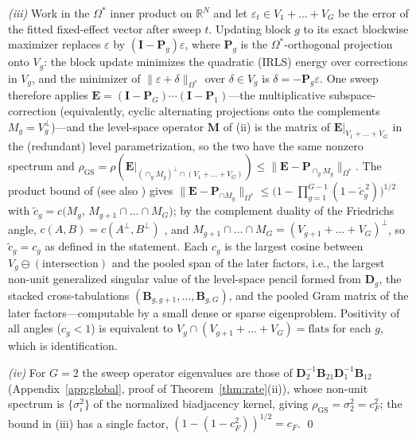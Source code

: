 \documentclass[11pt]{article}
\newcommand{\R}{\mathbb{R}}
\newcommand{\bB}{\mathbf{B}}
\newcommand{\bD}{\mathbf{D}}
\newcommand{\bI}{\mathbf{I}}
\newcommand{\bP}{\mathbf{P}}
\begin{document}
\emph{(iii)}  Work in the $\Omega^\ast$ inner product on $\R^N$ and let
$\varepsilon_t \in V_1 + \dots + V_G$ be the error of the fitted
fixed-effect vector after sweep $t$.  Updating block $g$ to its exact
blockwise maximizer replaces $\varepsilon$ by $(\bI -
\bP_g)\varepsilon$, where $\bP_g$ is the $\Omega^\ast$-orthogonal
projection onto $V_g$: the block update minimizes the quadratic (IRLS)
energy over corrections in $V_g$, and the minimizer of
$\|\varepsilon + \delta\|_{\Omega^\ast}$ over $\delta \in V_g$ is
$\delta = -\bP_g\varepsilon$.  One sweep therefore applies
$\mathbf{E} = (\bI - \bP_G)\cdots(\bI - \bP_1)$---the multiplicative
subspace-correction (equivalently, cyclic alternating projections onto
the complements $M_g = V_g^{\perp}$)---and the level-space operator
$\mathbf{M}$ of (ii) is the matrix of
$\mathbf{E}|_{V_1 + \dots + V_G}$ in the (redundant) level
parametrization, so the two have the same nonzero spectrum and
$\rho_{\mathrm{GS}} = \rho(\mathbf{E}|_{(\cap_g M_g)^{\perp} \cap (V_1 +
\dots + V_G)}) \le \|\mathbf{E} - \bP_{\cap_g M_g}\|_{\Omega^\ast}$.
The product bound of \citet{smith1977} (see also
\citealp{deutschhundal1997,badea2012}) gives
$\|\mathbf{E} - \bP_{\cap M_g}\|_{\Omega^\ast} \le \big(1 -
\prod_{g=1}^{G-1}(1 - \tilde c_g^{\,2})\big)^{1/2}$ with $\tilde c_g =
c\big(M_g,\, M_{g+1} \cap \dots \cap M_G\big)$; by the complement
duality of the Friedrichs angle, $c(A, B) = c(A^{\perp}, B^{\perp})$
\citep[Ch.~9]{deutsch2001}, and $M_{g+1} \cap \dots \cap M_G =
(V_{g+1} + \dots + V_G)^{\perp}$, so $\tilde c_g = c_g$ as defined in
the statement.  Each $c_g$ is the largest cosine between $V_g \ominus
(\text{intersection})$ and the pooled span of the later factors, i.e.,
the largest non-unit generalized singular value of the level-space
pencil formed from $\bD_g$, the stacked cross-tabulations
$(\bB_{g,g+1}, \dots, \bB_{g,G})$, and the pooled Gram matrix of the
later factors---computable by a small dense or sparse eigenproblem.
Positivity of all angles ($c_g < 1$) is equivalent to $V_g \cap
(V_{g+1} + \dots + V_G) = \text{flats}$ for each $g$, which is
identification.

\emph{(iv)}  For $G = 2$ the sweep operator eigenvalues are those of
$\bD_2^{-1}\bB_{21}\bD_1^{-1}\bB_{12}$ (Appendix~\ref{app:global},
proof of Theorem~\ref{thm:rate}(ii)), whose non-unit spectrum is
$\{\sigma_i^2\}$ of the normalized biadjacency kernel, giving
$\rho_{\mathrm{GS}} = \sigma_2^2 = c_F^2$; the bound in (iii) has a
single factor, $(1 - (1 - c_F^2))^{1/2} = c_F$. \qed

\end{document}
